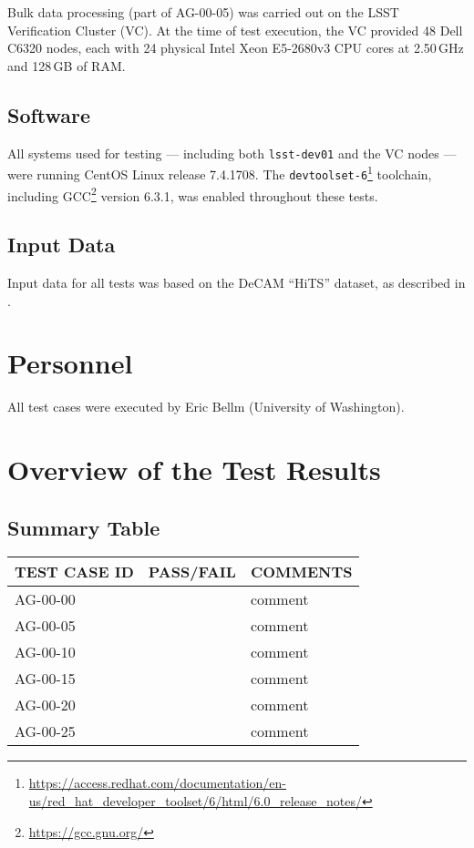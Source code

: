 \documentclass[DM,lsstdraft,STR,toc]{lsstdoc}
\begin{document}
Bulk data processing (part of AG-00-05) was carried out on the LSST Verification Cluster (VC).
At the time of test execution, the VC provided 48 Dell C6320 nodes, each with 24 physical Intel Xeon E5-2680v3 CPU cores at 2.50\,GHz and 128\,GB of RAM.

\subsection{Software}
\label{sect:swconf}

All systems used for testing --- including both \texttt{lsst-dev01} and the VC nodes --- were running CentOS Linux release 7.4.1708.
The \texttt{devtoolset-6}\footnote{\url{https://access.redhat.com/documentation/en-us/red_hat_developer_toolset/6/html/6.0_release_notes/}} toolchain, including GCC\footnote{\url{https://gcc.gnu.org/}} version 6.3.1, was enabled throughout these tests.

\subsection{Input Data}
\label{sect:inputdata}

Input data for all tests was based on the DeCAM “HiTS” dataset, as described in .

\section{Personnel}
\label{sect:personnel}

All test cases were executed by Eric Bellm (University of Washington).

\newpage

\section{Overview of the Test Results}
\label{sect:overview}

\subsection{Summary Table}
\label{sect:summarytable}

\begin{longtable} {|p{}|p{}|p{}|}\hline
{\bf TEST CASE ID} & {\bf PASS/FAIL} & {\bf COMMENTS} \\\hline
AG-00-00 & & comment \\\hline
AG-00-05 & & comment \\\hline
AG-00-10 & & comment \\\hline
AG-00-15 & & comment \\\hline
AG-00-20 & & comment \\\hline
AG-00-25 & & comment \\\hline
\end{longtable}
\end{document}
